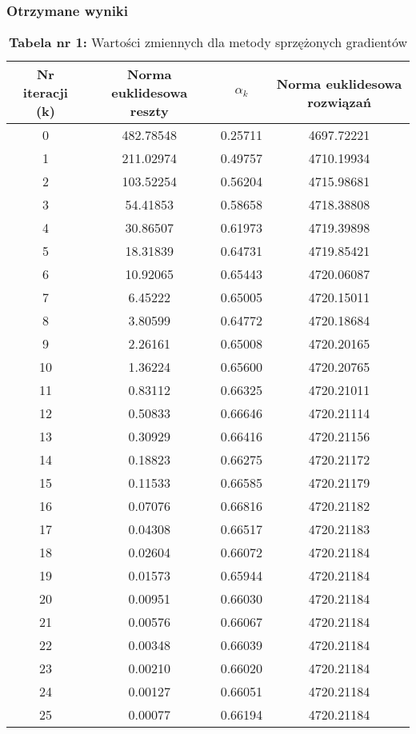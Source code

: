 \documentclass{article}
\begin{document}
\subsubsection{Otrzymane wyniki}
\begin{table}[htbp]
\centering
\caption*{\textbf{Tabela nr 1:} Wartości zmiennych dla metody sprzężonych gradientów}
\label{tab:metoda_sprzezonych_gradientow}
\begin{tabular}{cccc}
\toprule
Nr iteracji (k) & Norma euklidesowa reszty & $\alpha_k$ & Norma euklidesowa rozwiązań \\
\midrule
0 & 482.78548 & 0.25711 & 4697.72221 \\
1 & 211.02974 & 0.49757 & 4710.19934 \\
2 & 103.52254 & 0.56204 & 4715.98681 \\
3 & 54.41853 & 0.58658 & 4718.38808 \\
4 & 30.86507 & 0.61973 & 4719.39898 \\
5 & 18.31839 & 0.64731 & 4719.85421 \\
6 & 10.92065 & 0.65443 & 4720.06087 \\
7 & 6.45222 & 0.65005 & 4720.15011 \\
8 & 3.80599 & 0.64772 & 4720.18684 \\
9 & 2.26161 & 0.65008 & 4720.20165 \\
10 & 1.36224 & 0.65600 & 4720.20765 \\
11 & 0.83112 & 0.66325 & 4720.21011 \\
12 & 0.50833 & 0.66646 & 4720.21114 \\
13 & 0.30929 & 0.66416 & 4720.21156 \\
14 & 0.18823 & 0.66275 & 4720.21172 \\
15 & 0.11533 & 0.66585 & 4720.21179 \\
16 & 0.07076 & 0.66816 & 4720.21182 \\
17 & 0.04308 & 0.66517 & 4720.21183 \\
18 & 0.02604 & 0.66072 & 4720.21184 \\
19 & 0.01573 & 0.65944 & 4720.21184 \\
20 & 0.00951 & 0.66030 & 4720.21184 \\
21 & 0.00576 & 0.66067 & 4720.21184 \\
22 & 0.00348 & 0.66039 & 4720.21184 \\
23 & 0.00210 & 0.66020 & 4720.21184 \\
24 & 0.00127 & 0.66051 & 4720.21184 \\
25 & 0.00077 & 0.66194 & 4720.21184 \\
\bottomrule
\end{tabular}
\end{table}
\end{document}
